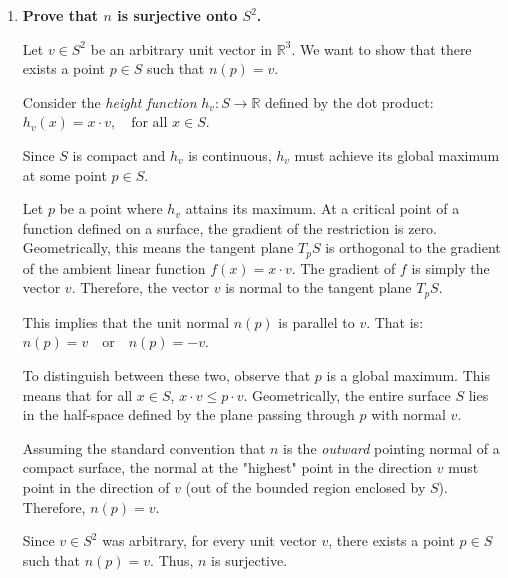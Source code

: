 \documentclass[a4paper,12pt]{article}
\begin{document}
\begin{enumerate}[label=(\roman*)]
    \item \textbf{Prove that $n$ is surjective onto $S^2$.}\par
    Let $v \in S^2$ be an arbitrary unit vector in $\mathbb{R}^3$. We want to show that there exists a point $p \in S$ such that $n(p) = v$.

Consider the \textit{height function} $h_v: S \to \mathbb{R}$ defined by the dot product: $h_v(x) = x \cdot v, \quad \text{for all } x \in S$.\par
Since $S$ is compact and $h_v$ is continuous, $h_v$ must achieve its global maximum at some point $p \in S$.\par
Let $p$ be a point where $h_v$ attains its maximum. At a critical point of a function defined on a surface, the gradient of the restriction is zero. Geometrically, this means the tangent plane $T_p S$ is orthogonal to the gradient of the ambient linear function $f(x) = x \cdot v$. The gradient of $f$ is simply the vector $v$. Therefore, the vector $v$ is normal to the tangent plane $T_p S$.\par
This implies that the unit normal $n(p)$ is parallel to $v$. That is: $n(p) = v \quad \text{or} \quad n(p) = -v.$\par
To distinguish between these two, observe that $p$ is a global maximum. This means that for all $x \in S$, $x \cdot v \leq p \cdot v$. Geometrically, the entire surface $S$ lies in the half-space defined by the plane passing through $p$ with normal $v$. 

Assuming the standard convention that $n$ is the \textit{outward} pointing normal of a compact surface, the normal at the "highest" point in the direction $v$ must point in the direction of $v$ (out of the bounded region enclosed by $S$). Therefore, $n(p) = v$.

Since $v \in S^2$ was arbitrary, for every unit vector $v$, there exists a point $p \in S$ such that $n(p) = v$. Thus, $n$ is surjective.


\end{enumerate}
\end{document}
